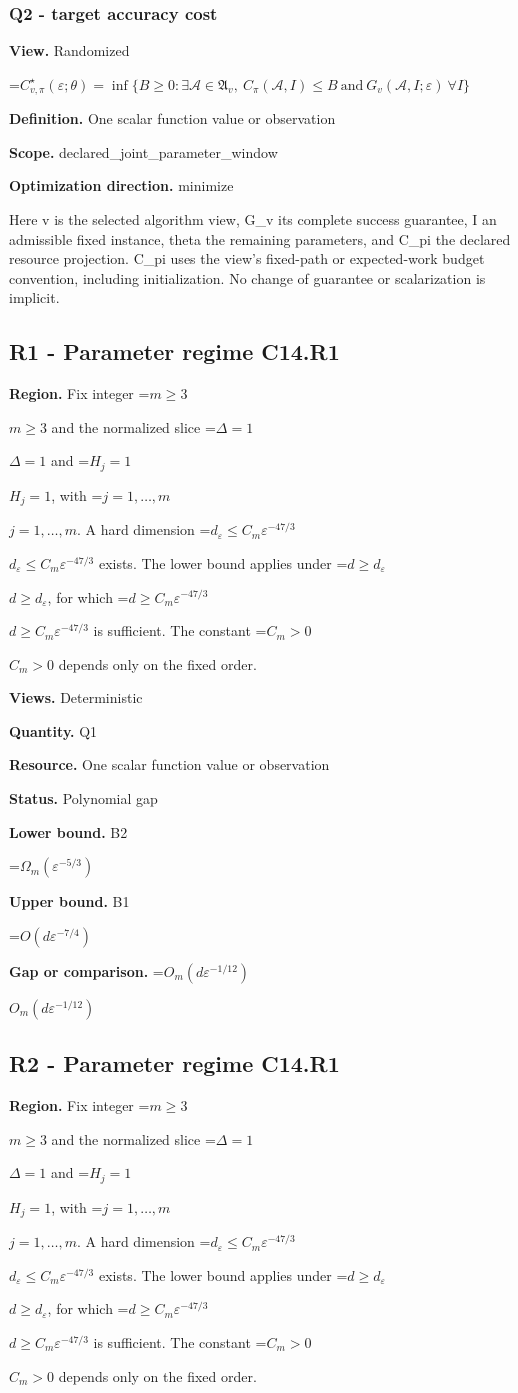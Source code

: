 \documentclass[10pt,a4paper]{article}
\newcommand{\AtlasMath}[1]{\par\begingroup\centering\setbox0=\hbox{$\displaystyle #1$}\ifdim\wd0>1.4\linewidth\typeout{ATLAS WIDE FORMULA: \the\wd0}\fi\ifdim\wd0>\linewidth\resizebox{\linewidth}{!}{\box0}\else\box0\fi\par\endgroup}
\newcommand{\AtlasInlineMath}[1]{\begingroup\setbox0=\hbox{$#1$}\ifdim\wd0>.4\linewidth\endgroup\AtlasMath{#1}\else\endgroup$#1$\fi}
\begin{document}
\subsubsection{Q2 - target accuracy cost}
\textbf{View.} Randomized

\AtlasMath{C^\star_{v,\pi}(\varepsilon;\theta)=\inf\{B\ge0:\exists\mathcal A\in\mathfrak A_v,\ C_\pi(\mathcal A,I)\le B\ \text{and}\ G_v(\mathcal A,I;\varepsilon)\ \forall I\}}
\textbf{Definition.} One scalar function value or observation

\textbf{Scope.} declared\_joint\_parameter\_window

\textbf{Optimization direction.} minimize

Here v is the selected algorithm view, G\_v its complete success guarantee, I an admissible fixed instance, theta the remaining parameters, and C\_pi the declared resource projection. C\_pi uses the view's fixed-path or expected-work budget convention, including initialization. No change of guarantee or scalarization is implicit.

\subsection{R1 - Parameter regime C14.R1}
\textbf{Region.} Fix integer \AtlasInlineMath{m\ge3} and the normalized slice \AtlasInlineMath{\Delta=1} and \AtlasInlineMath{H_j=1}, with \AtlasInlineMath{j=1,\ldots,m}. A hard dimension \AtlasInlineMath{d_\varepsilon\le C_m\varepsilon^{-47/3}} exists. The lower bound applies under \AtlasInlineMath{d\ge d_\varepsilon}, for which \AtlasInlineMath{d\ge C_m\varepsilon^{-47/3}} is sufficient. The constant \AtlasInlineMath{C_m>0} depends only on the fixed order.

\textbf{Views.} Deterministic

\textbf{Quantity.} Q1

\textbf{Resource.} One scalar function value or observation

\textbf{Status.} Polynomial gap

\textbf{Lower bound.} B2

\AtlasMath{\Omega_m(\varepsilon^{-5/3})}
\textbf{Upper bound.} B1

\AtlasMath{O(d\varepsilon^{-7/4})}
\textbf{Gap or comparison.} \AtlasInlineMath{O_m(d\varepsilon^{-1/12})}

\subsection{R2 - Parameter regime C14.R1}
\textbf{Region.} Fix integer \AtlasInlineMath{m\ge3} and the normalized slice \AtlasInlineMath{\Delta=1} and \AtlasInlineMath{H_j=1}, with \AtlasInlineMath{j=1,\ldots,m}. A hard dimension \AtlasInlineMath{d_\varepsilon\le C_m\varepsilon^{-47/3}} exists. The lower bound applies under \AtlasInlineMath{d\ge d_\varepsilon}, for which \AtlasInlineMath{d\ge C_m\varepsilon^{-47/3}} is sufficient. The constant \AtlasInlineMath{C_m>0} depends only on the fixed order.
\end{document}

